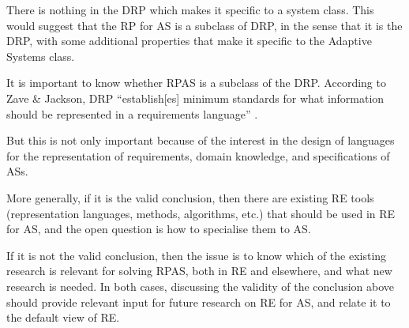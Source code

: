 \documentclass[graybox]{svmult}
\newcommand{\RE}{RE}
\newcommand{\RP}{RP}
\newcommand{\ASfull}{Adaptive System}
\newcommand{\AS}{AS}
\newcommand{\RPAS}{RPAS}
\newcommand{\ZJRP}{DRP}
\begin{document}
There is nothing in the \ZJRP{} which makes it specific to a system class. This would suggest that the \RP{} for \AS{} is a subclass of \ZJRP, in the sense that it is the \ZJRP, with some additional properties that make it specific to the \ASfull s class.

It is important to know whether \RPAS{} is a subclass of the \ZJRP{}. According to Zave \& Jackson, \ZJRP{} ``establish[es] minimum standards for what information should be represented in a requirements language'' \cite{zave1997four}. 

But this is not only important because of the interest in the design of languages for the representation of requirements, domain knowledge, and specifications of \AS s. 

More generally, if it is the valid conclusion, then there are existing \RE{} tools (representation languages, methods, algorithms, etc.) that should be used in \RE{} for \AS, and the open question is how to specialise them to \AS. 

If it is not the valid conclusion, then the issue is to know which of the existing research is relevant for solving \RPAS, both in \RE{} and elsewhere, and what new research is needed. In both cases, discussing the validity of the conclusion above should provide relevant input for future research on \RE{} for \AS, and relate it to the default view of \RE. 


%
\end{document}
